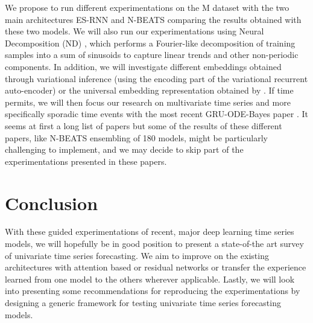 \documentclass{article}
\begin{document}
We propose to run different experimentations on the M dataset with the two main architectures ES-RNN and N-BEATS comparing the results obtained with these two models.
We will also run our experimentations using Neural Decomposition (ND) \cite{NeuralDecomposition}, which performs a Fourier-like decomposition of training samples into a sum of sinusoids to capture linear trends and other non-periodic components. 
In addition, we will investigate different embeddings obtained through variational inference (using the encoding part of the variational recurrent auto-encoder) or the universal embedding representation obtained by \cite{Franceschi}.
If time permits, we will then focus our research on multivariate time series and more specifically sporadic time events with the most recent GRU-ODE-Bayes paper \cite{GRUODEBayes}. 
It seems at first a long list of papers but some of the results of these different papers, like  N-BEATS ensembling of 180 models, might be particularly challenging to implement, and we may decide to skip part of the experimentations presented
in these papers.

\section{Conclusion}
With these guided experimentations of recent, major deep learning time series models, we will hopefully be in good position to present a state-of-the art survey of univariate time series forecasting.
We aim to improve on the existing architectures with attention based or residual networks or transfer the experience learned from one model to the others wherever applicable. Lastly, we will look into 
presenting some recommendations for reproducing the experimentations by designing a generic framework for testing univariate time series forecasting models. 

 

\end{document}
